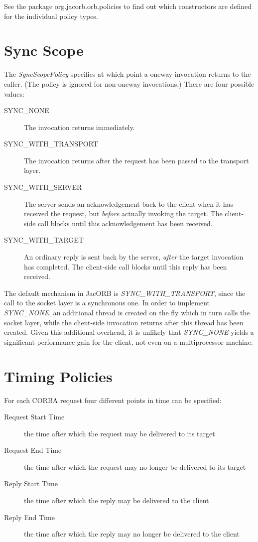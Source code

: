 See the package org.jacorb.orb.policies to find out which
constructors are defined for the individual policy types.

\section{Sync Scope}

The \emph{SyncScopePolicy} specifies at which point a oneway
invocation returns to the caller.  (The policy is ignored for
non-oneway invocations.)  There are four possible
values:

\begin{description}
\item[SYNC\_NONE] The invocation returns immediately.
\item[SYNC\_WITH\_TRANSPORT] The invocation returns after the request
  has been passed to the transport layer.
\item[SYNC\_WITH\_SERVER] The server sends an
  acknowledgement back to the client when it has received the
  request, but \emph{before} actually invoking the target.  The
  client-side call blocks until this acknowledgement has been
  received.
\item[SYNC\_WITH\_TARGET] An ordinary reply is sent back by the
  server, \emph{after} the target invocation has completed.  The
  client-side call blocks until this reply has been received.
\end{description}

The default mechanism in JacORB is \emph{SYNC\_WITH\_TRANSPORT},
since the call to the socket layer is a synchronous one.  In order to
implement \emph{SYNC\_NONE}, an additional thread is created on the
fly which in turn calls the socket layer, while the client-side
invocation returns after this thread has been created.  Given this
additional overhead, it is unlikely that \emph{SYNC\_NONE} yields a
significant performance gain for the client, not even on a
multiprocessor machine.

\section{Timing Policies}

For each CORBA request four different points in time can be specified:

\begin{description}
\item[Request Start Time] the time after which the request may be
  delivered to its target
\item[Request End Time] the time after which the request may no longer
  be delivered to its target
\item[Reply Start Time] the time after which the reply may be delivered
  to the client
\item[Reply End Time] the time after which the reply may no longer be
  delivered to the client
\end{description}


